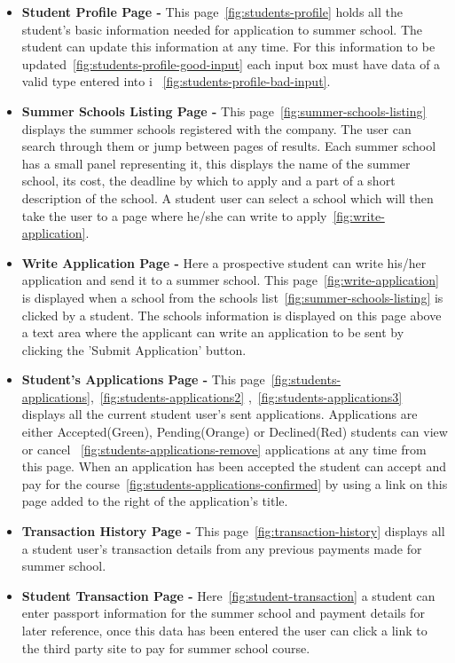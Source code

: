 \documentclass{project}
\begin{document}
\begin{itemize}
\item \textbf{Student Profile Page -}
This page~\ref{fig:students-profile} holds all the student's basic information needed for application to summer school. The student can update this information at any time. For this information to be updated~\ref{fig:students-profile-good-input} each input box must have data of a valid type entered into i ~\ref{fig:students-profile-bad-input}. 

\item\textbf{Summer Schools Listing Page -}
This page~\ref{fig:summer-schools-listing} displays the summer schools registered with the company. The user can search through them or jump between pages of results. Each summer school has a small panel representing it, this displays the name of the summer school, its cost, the deadline by which to apply and a part of a short description of the school. A student user can select a school which will then take the user to a page where he/she can write to apply~\ref{fig:write-application}.

\item\textbf{Write Application Page -}
Here a prospective student can write his/her application and send it to a summer school. This page~\ref{fig:write-application} is displayed when a school from the schools list~\ref{fig:summer-schools-listing} is clicked by a student. The schools information is displayed on this page above a text area where the applicant can write an application to be sent by clicking the 'Submit Application' button.

\item\textbf{Student's Applications Page -}
This page~\ref{fig:students-applications},~\ref{fig:students-applications2} ,~\ref{fig:students-applications3} displays all the current student user's sent applications. Applications are either Accepted(Green), Pending(Orange) or Declined(Red) students can view or cancel ~\ref{fig:students-applications-remove} applications at any time from this page. When an application has been accepted the student can accept and pay for the course~\ref{fig:students-applications-confirmed} by using a link on this page added to the right of the application's title. 

\item\textbf{Transaction History Page -}
This page~\ref{fig:transaction-history} displays all a student user's transaction details from any previous payments made for summer school.

\item\textbf{Student Transaction Page -}
Here~\ref{fig:student-transaction} a student can enter passport information for the summer school and  payment details for later reference, once this data has been entered the user can click a link to the third party site to pay for summer school course.


\end{itemize}
\end{document}
